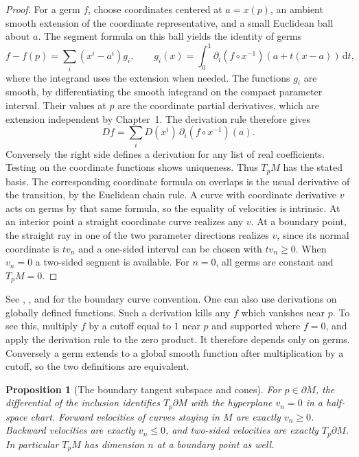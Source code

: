 \documentclass[11pt,oneside,openany]{book}
\newtheorem{proposition}[theorem]{Proposition}
\theoremstyle{definition}
\theoremstyle{remark}
\newcommand{\dd}{\mathrm d}
\begin{document}
\begin{proof}
For a germ \(f\), choose coordinates centered at \(a=x(p)\),
an ambient smooth extension of the coordinate representative,
and a small Euclidean ball about \(a\). The segment formula on
this ball yields the identity of germs
\[
  f-f(p)=\sum_i(x^i-a^i)g_i,\qquad
  g_i(x)=\int_0^1
    \partial_i(f\circ x^{-1})(a+t(x-a))\,\dd t ,
\]
where the integrand uses the extension when needed. The
functions \(g_i\) are smooth, by differentiating the smooth
integrand on the compact parameter interval. Their values at
\(p\) are the coordinate partial derivatives, which are
extension independent by Chapter~1. The derivation rule
therefore gives
\[
  Df=\sum_i D(x^i)\,\partial_i(f\circ x^{-1})(a).
\]
Conversely the right side defines a derivation for any list of
real coefficients. Testing on the coordinate functions shows
uniqueness. Thus \(T_pM\) has the stated basis. The corresponding
coordinate formula on overlaps is the usual derivative of
the transition, by the Euclidean chain rule. A curve with
coordinate derivative \(v\) acts on germs by that same formula,
so the equality of velocities is intrinsic. At an interior
point a straight coordinate curve realizes any \(v\).
At a boundary point, the straight ray in one of the two
parameter directions realizes \(v\), since its normal
coordinate is \(tv_n\) and a one-sided interval can be chosen
with \(tv_n\geq0\). When \(v_n=0\) a two-sided segment is
available. For \(n=0\), all germs are constant and \(T_pM=0\).
\end{proof}

See \cite[pp.~50--55 and 68--73]{lee},
\cite[Section~8]{tu}, and \cite[Problem~3-8]{leeerrata} for the
boundary curve convention. One can also use derivations on
globally defined functions. Such a derivation kills any \(f\)
which vanishes near \(p\). To see this, multiply \(f\) by a
cutoff equal to \(1\) near \(p\) and supported where \(f=0\), and apply the
derivation rule to the zero product. It therefore depends
only on germs. Conversely a germ extends to a global smooth
function after multiplication by a cutoff, so the two
definitions are equivalent.

\begin{proposition}[The boundary tangent subspace and cones]\label{p104:M02.02}
For \(p\in\partial M\), the differential of the inclusion
identifies \(T_p\partial M\) with the hyperplane \(v_n=0\)
in a half-space chart. Forward velocities of curves staying
in \(M\) are exactly \(v_n\geq0\). Backward velocities are
exactly \(v_n\leq0\), and two-sided velocities are exactly
\(T_p\partial M\). In particular \(T_pM\) has dimension \(n\)
at a boundary point as well.
\end{proposition}
\end{document}
